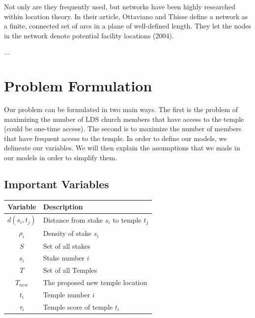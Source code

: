 \documentclass[twoside,twocolumn]{article}
\begin{document}
Not only are they frequently used, but networks have been highly researched within location theory.
In their article, Ottaviano and Thisse define a network as a finite, connected set of arcs in a plane of well-defined length.
They let the nodes in the network denote potential facility locations (2004). %


...

\section{Problem Formulation}
\label{sec:prob}

Our problem can be formulated in two main ways. %
The first is the problem of maximizing the number of LDS church members that have access to the temple (could be one-time access). %
The second is to maximize the number of members that have frequent access to the temple. %
In order to define our models, we delineate our variables.
We will then explain the assumptions that we made in our models in order to simplify them.

\subsection{Important Variables}
\begin{tabular}{c | l}
Variable & Description\\
\hline
$d(s_{i},t_{j})$ & Distance from stake $s_{i}$ to temple $t_{j}$\\
$\rho_{i}$ & Density of stake $s_{i}$\\
$S$ & Set of all stakes\\
$s_{i}$ & Stake number $i$\\
$T$ & Set of all Temples\\
$T_{new}$ & The proposed new temple location\\
$t_{i}$ & Temple number $i$ \\
$\tau_{i}$ & Temple score of temple $t_{i}$\\
\end{tabular}
\vspace{0.1in}
\end{document}
